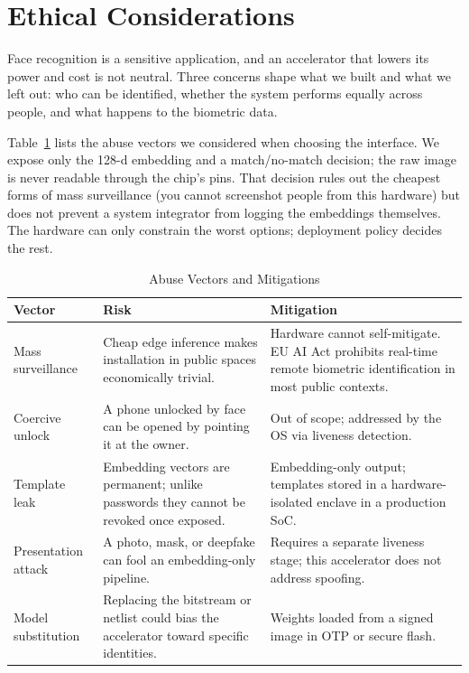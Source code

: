 \section{Ethical Considerations}
\label{sec:ethics}

Face recognition is a sensitive application, and an accelerator that lowers its power and cost is not neutral. Three concerns shape what we built and what we left out: who can be identified, whether the system performs equally across people, and what happens to the biometric data.

Table~\ref{tab:abuse} lists the abuse vectors we considered when choosing the interface. We expose only the 128-d embedding and a match/no-match decision; the raw image is never readable through the chip's pins. That decision rules out the cheapest forms of mass surveillance (you cannot screenshot people from this hardware) but does not prevent a system integrator from logging the embeddings themselves. The hardware can only constrain the worst options; deployment policy decides the rest.

\begin{table}[H]
\centering
\caption{Abuse Vectors and Mitigations}
\label{tab:abuse}
\begin{tabularx}{\textwidth}{l X X}
\toprule
\textbf{Vector} & \textbf{Risk} & \textbf{Mitigation} \\
\midrule
Mass surveillance & Cheap edge inference makes installation in public spaces economically trivial. & Hardware cannot self-mitigate. EU AI Act prohibits real-time remote biometric identification in most public contexts. \\
Coercive unlock & A phone unlocked by face can be opened by pointing it at the owner. & Out of scope; addressed by the OS via liveness detection. \\
Template leak & Embedding vectors are permanent; unlike passwords they cannot be revoked once exposed. & Embedding-only output; templates stored in a hardware-isolated enclave in a production SoC. \\
Presentation attack & A photo, mask, or deepfake can fool an embedding-only pipeline. & Requires a separate liveness stage; this accelerator does not address spoofing. \\
Model substitution & Replacing the bitstream or netlist could bias the accelerator toward specific identities. & Weights loaded from a signed image in OTP or secure flash. \\
\bottomrule
\end{tabularx}
\end{table}

